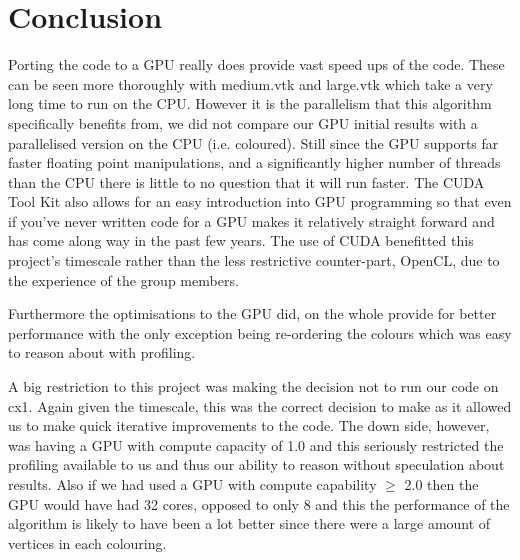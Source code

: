\section*{Conclusion}
Porting the code to a GPU really does provide vast speed ups of the code. These can be seen more thoroughly with medium.vtk and large.vtk which take a very long time to run on the CPU.
However it is the parallelism that this algorithm specifically benefits from, we did not compare our GPU initial results with a parallelised version on the CPU (i.e. coloured). Still since the GPU supports far faster floating point manipulations, and a significantly higher number of threads than the CPU there is little to no question that it will run faster.
The CUDA Tool Kit also allows for an easy introduction into GPU programming so that even if you've never written code for a GPU makes it relatively straight forward and has come along way in the past few years. The use of CUDA benefitted this project's timescale rather than the less restrictive counter-part, OpenCL, due to the experience of the group members.

Furthermore the optimisations to the GPU did, on the whole provide for better performance with the only exception being re-ordering the colours which was easy to reason about with profiling.

A big restriction to this project was making the decision not to run our code on cx1. Again given the timescale, this was the correct decision to make as it allowed us to make quick iterative improvements to the code. The down side, however, was having a GPU with compute capacity of 1.0 and this seriously restricted the profiling available to us and thus our ability to reason without speculation about results.
Also if we had used a GPU with compute capability $\ge$ 2.0 then the GPU would have had 32 cores\cite{compute_2.0}, opposed to only 8 and this the performance of the algorithm is likely to have been a lot better since there were a large amount of vertices in each colouring.
